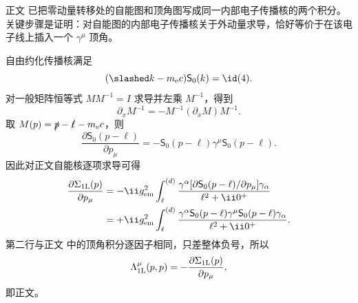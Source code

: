 \begin{derivation}

正文 已把零动量转移处的自能图和顶角图写成同一内部电子传播核的两个积分。关键步骤是证明：对自能图的内部电子传播核关于外动量求导，恰好等价于在该电子线上插入一个 \(\gamma^\mu\) 顶角。

自由约化传播核满足
\begin{equation*}
(\slashed k-m_{\mathrm e} c)\mathsf S_0(k)=\id(4).
\end{equation*}
对一般矩阵恒等式 \(M M^{-1}=I\) 求导并左乘 \(M^{-1}\)，得到
\begin{equation*}
\partial_xM^{-1}
=-M^{-1}(\partial_xM)M^{-1}.
\end{equation*}
取 \(M(p)=\slashed p-\slashed\ell-m_{\mathrm e} c\)，则
\begin{equation*}
\frac{\partial\mathsf S_0(p-\ell)}{\partial p_\mu}
=-\mathsf S_0(p-\ell)\gamma^\mu\mathsf S_0(p-\ell).
\end{equation*}
因此对正文自能核逐项求导可得
\begin{align*}
\frac{\partial\Sigma_{\rm 1L}(p)}{\partial p_\mu}
&=-\ii g_{\rm em}^2
\int_{\ell}^{(d)}
\frac{\gamma^\alpha
[\partial\mathsf S_0(p-\ell)/\partial p_\mu]
\gamma_\alpha}
{\ell^2+\ii0^+}\\
&=+\ii g_{\rm em}^2
\int_{\ell}^{(d)}
\frac{\gamma^\alpha\mathsf S_0(p-\ell)
\gamma^\mu\mathsf S_0(p-\ell)\gamma_\alpha}
{\ell^2+\ii0^+}.
\end{align*}
第二行与正文 中的顶角积分逐因子相同，只差整体负号，所以
\begin{equation*}
\Lambda_{\rm 1L}^{\mu}(p,p)
=-\frac{\partial\Sigma_{\rm 1L}(p)}{\partial p_\mu},
\end{equation*}
即正文。
\end{derivation}

